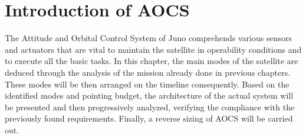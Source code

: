 \section{Introduction of AOCS}
\label{sec:AOCS_introduction}

The Attitude and Orbital Control System of Juno comprehends various sensors and actuators that are vital to maintain the satellite in operability conditions and to execute all the basic tasks.
In this chapter, the main modes of the satellite are deduced through the analysis of the mission already done in previous chapters. These modes will be then arranged on the timeline consequently.
Based on the identified modes and pointing budget, the architecture of the actual system will be presented and then progressively analyzed, verifying the compliance with the previously found requirements.
Finally, a reverse sizing of AOCS will be carried out.